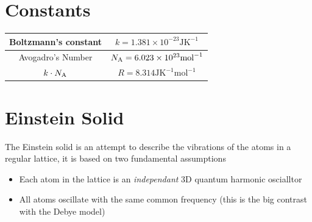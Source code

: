 \documentclass[a4paper, 11pt, notitlepage, english]{article}
\begin{document}
\section*{Constants}

\begin{center}
\begin{tabular}{|c|c|}	
\hline
Boltzmann's constant & $k = 1.381\times10^{-23} \mbox{JK}^{-1}$ \\ \hline 
Avogadro's Number & $N_{\rm A} = 6.023\times10^{23} \mbox{mol}^{-1}$ \\ \hline 
$k\cdot N_{\rm A}$ & $R = 8.314 \mbox{JK}^{-1}\mbox{mol}^{-1}$ \\ \hline
\end{tabular}
\end{center}

\clearpage

\section*{Einstein Solid}

The Einstein solid is an attempt to describe the vibrations of the atoms in a regular lattice, it is based on two fundamental assumptions
\begin{itemize}
	\item Each atom in the lattice is an \emph{independant} 3D quantum harmonic oscialltor
	\item All atoms oscillate with the same common frequency (this is the big contrast with the Debye model) 
\end{itemize}
\end{document}
